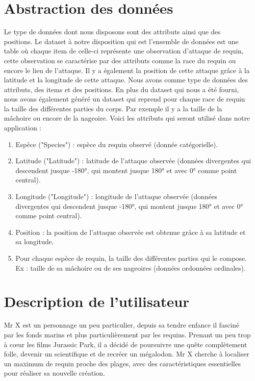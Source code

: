 \documentclass{article}
\begin{document}
\newpage
\section{Abstraction des données}

Le type de données dont nous disposons sont des attributs ainsi que des positions. Le dataset à notre disposition qui est l’ensemble de données est une table où chaque item de celle-ci représente une observation d’attaque de requin, cette observation se caractérise par des attributs comme la race du requin ou encore le lieu de l’attaque. Il y a également la position de cette attaque grâce à la latitude et la longitude de cette attaque. Nous avons comme type de données des attributs, des items et des positions. En plus du dataset qui nous a été fourni, nous avons également généré un dataset qui reprend pour chaque race de requin la taille des différentes parties du corps. Par exemple il y a la taille de la mâchoire ou encore de la nageoire. Voici les attributs qui seront utilisé dans notre application :

\begin{enumerate}
	\item Espèce ("Species") : espèce du requin observé (donnée catégorielle).
	\item Latitude ("Latitude") : latitude de l’attaque observée (données divergentes qui descendent jusque -\ang{180}, qui montent jusque \ang{180} et avec \ang{0} comme point central).
	\item Longitude ("Longitude") : longitude de l’attaque observée (données divergentes qui descendent jusque -\ang{180}, qui montent jusque \ang{180} et avec \ang{0} comme point central).
	\item Position : la position de l’attaque observée est obtenue grâce à sa latitude et sa longitude.
	\item Pour chaque espèce de requin, la taille des différentes parties qui le compose. Ex : taille de sa mâchoire ou de ses nageoires (données ordonnées ordinales).
\end{enumerate}

\newpage
\section{Description de l’utilisateur}

Mr X est un personnage un peu particulier, depuis sa tendre enfance il fasciné par les fonds marins et plus particulièrement par les requins. Prenant un peu trop à cœur les films Jurassic Park, il a décidé de poursuivre une quête complètement folle, devenir un scientifique et de recréer un mégalodon. Mr X cherche à localiser un maximum de requin proche des plages, avec des caractéristiques essentielles pour réaliser sa nouvelle création.
\end{document}
